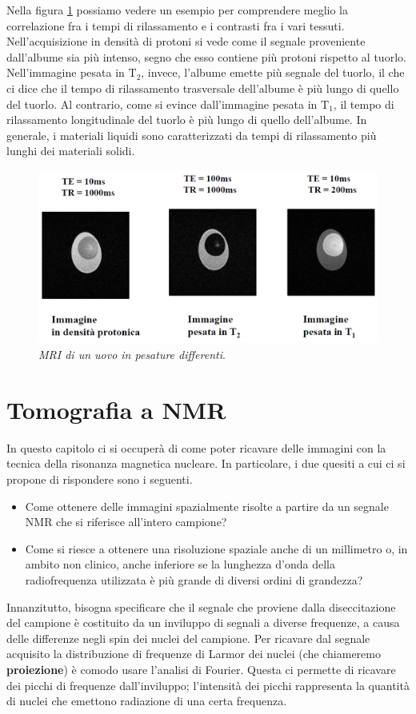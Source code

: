 \documentclass{report}
\newcommand{\figref}[1]{figura \ref{#1}}
\numberwithin{equation}{section}
\numberwithin{figure}{section}
\begin{document}
Nella \figref{fig:uovo} possiamo vedere un esempio per comprendere meglio la correlazione fra i tempi di rilassamento e i contrasti fra i vari tessuti. Nell'acquisizione in densità di protoni si vede come il segnale proveniente dall'albume sia più intenso, segno che esso contiene più protoni rispetto al tuorlo. Nell'immagine pesata in $\mathrm{T_2}$, invece, l'albume emette più segnale del tuorlo, il che ci dice che il tempo di rilassamento trasversale dell'albume è più lungo di quello del tuorlo. Al contrario, come si evince dall'immagine pesata in $\mathrm{T_1}$, il tempo di rilassamento longitudinale del tuorlo è più lungo di quello dell'albume. In generale, i materiali liquidi sono caratterizzati da tempi di rilassamento più lunghi dei materiali solidi.

\begin{figure}[htp]
\centering
\includegraphics[scale=0.6]{immagini/uovo.png}
\caption{\label{fig:uovo} \textit{MRI di un uovo in pesature differenti}.}
\end{figure}

\section{Tomografia a NMR}
In questo capitolo ci si occuperà di come poter ricavare delle immagini con la tecnica della risonanza magnetica nucleare. In particolare, i due quesiti a cui ci si propone di rispondere sono i seguenti.
\begin{itemize}[label=$-$]
    \item Come ottenere delle immagini spazialmente risolte a partire da un segnale NMR che si riferisce all'intero campione?
    \item Come si riesce a ottenere una risoluzione spaziale anche di un millimetro o, in ambito non clinico, anche inferiore se la lunghezza d'onda della radiofrequenza utilizzata è più grande di diversi ordini di grandezza?
\end{itemize}
Innanzitutto, bisogna specificare che il segnale che proviene dalla diseccitazione del campione è costituito da un inviluppo di segnali a diverse frequenze, a causa delle differenze negli spin dei nuclei del campione. Per ricavare dal segnale acquisito la distribuzione di frequenze di Larmor dei nuclei (che chiameremo \textbf{proiezione}) è comodo usare l'analisi di Fourier. Questa ci permette di ricavare dei picchi di frequenze dall'inviluppo; l'intensità dei picchi rappresenta la quantità di nuclei che emettono radiazione di una certa frequenza.
\end{document}
